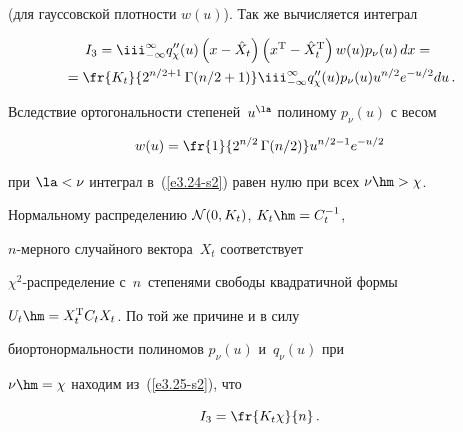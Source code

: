 (для гауссовской плотности $w(u)$). Так же вычисляется  интеграл



\noindent

\begin{multline}

    I_3 = \iii_{-\infty}^\infty q_\chi ''(u) \left(x-\hat

    X_t\right)\left(x^{\mathrm{T}}-\hat X_t^{\mathrm{T}}\right) w(u) p_\nu (u)\, dx={}\\

    {}=

 \fr{K_t}{2^{n/2+1}\, \Gamma

    (n/2+1)} \iii_{-\infty}^\infty q_\chi ''(u) p_\nu (u) u^{n/2}

    e^{-u/2} du\,.

    \label{e3.25-s2}

    \end{multline}



Вследствие ортогональности степеней~$u^\la$ полиному $p_\nu(u)$ с весом



\noindent

\begin{equation*}

w(u) =\fr{1}{2^{n/2}\, \Gamma (n/2)} u^{n/2-1}   e^{-u/2}


\end{equation*}

при $ \la<\nu$ интеграл в~(\ref{e3.24-s2}) равен нулю при всех $\nu \hm>\chi$. 

Нормальному распределению ${\cal N}(0,K_t)$, $K_t\hm=C_t^{-1}$,

$n$-мер\-но\-го случайного вектора~$X_t$ соответствует

$\chi^2$-рас\-пре\-де\-ле\-ние с~$n$~степенями свободы квадратичной формы

$U_t\hm= X_t^{\mathrm{T}} C_tX_t$. По той же причине и в силу

биортонормальности полиномов $p_\nu (u)$ и~$q_\nu (u)$ при

$\nu\hm=\chi$ находим из~(\ref{e3.25-s2}), что

\begin{equation*}

I_3 =\fr{K_t \chi}{n}\,.


\end{equation*}

